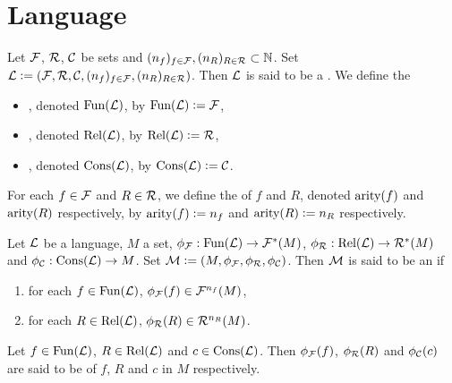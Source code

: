 \documentclass{book}
\begin{document}
	\begin{ex}
		
	\end{ex}
	
	
	
	
	
	
	
	
	
	
	
	
	
	
	
	
	
	
	\newpage
	
	\section{Language}
	
	\begin{defn}
		Let $\MF$, $\MR$, $\MC$ be sets and $(n_f)_{f \in \MF}, (n_R)_{R \in \MR} \subset \N$. Set $\ML \defeq (\MF, \MR, \MC, (n_f)_{f \in \MF}, (n_R)_{R \in \MR})$. Then $\ML$ is said to be a . 
		We define the 
		\begin{itemize}
			\item {}, denoted $\Fun(\ML)$, by $\Fun(\ML) \defeq \MF$,
			\item {}, denoted $\Rel(\ML)$, by $\Rel(\ML) \defeq \MR$,
			\item {}, denoted $\Cons(\ML)$, by $\Cons(\ML) \defeq \MC$.
		\end{itemize}
		For each $f \in \MF$ and $R \in \MR$, we define the  of $f$ and $R$, denoted $\ar(f)$ and $\ar(R)$ respectively, by $\ar(f) \defeq n_f$ and $\ar(R) \defeq n_R$ respectively.
	\end{defn}

	\begin{defn}
		Let $\ML$ be a language, $M$ a set, $\phi_{\MF}: \Fun(\ML) \rightarrow \MF^*(M)$, $\phi_{\MR}: \Rel(\ML) \rightarrow \MR^*(M)$ and $\phi_{\MC}: \Cons(\ML) \rightarrow M$. Set $\MM \defeq (M, \phi_{\MF}, \phi_{\MR}, \phi_{\MC})$. Then $\MM$ is said to be an \tbf{$\ML$-structure on $M$} if 
		\begin{enumerate}
			\item for each $f \in \Fun(\ML)$, $\phi_{\MF}(f) \in \MF^{n_f}(M)$,
			\item for each $R \in \Rel(\ML)$, $\phi_{\MR}(R) \in \MR^{n_R}(M)$.
		\end{enumerate}
		Let $f \in \Fun(\ML)$, $R \in \Rel(\ML)$ and $c \in \Cons(\ML)$. Then $\phi_{\MF}(f)$, $\phi_{\MR}(R)$ and $\phi_{\MC}(c)$ are said to be  of $f$, $R$ and $c$ in $M$ respectively.
	\end{defn}
	
\end{document}
